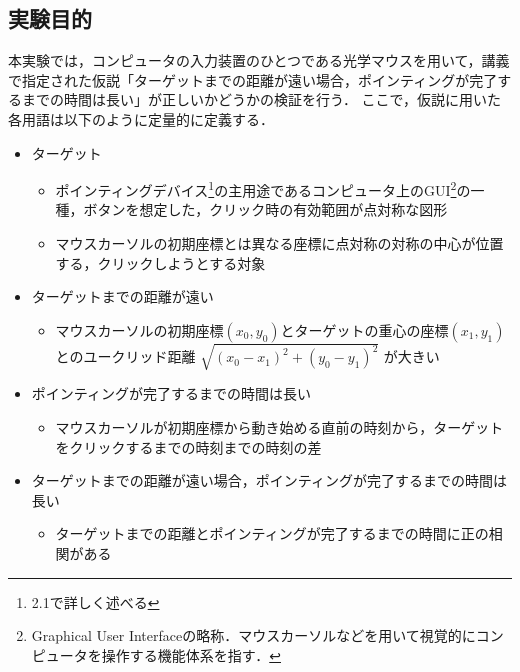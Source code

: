 \documentclass[a4paper, papersize, titlepage]{jsarticle}
\begin{document}
\begin{multicols}{2}
\section{実験目的}
本実験では，コンピュータの入力装置のひとつである光学マウスを用いて，講義で指定された仮説「ターゲットまでの距離が遠い場合，ポインティングが完了するまでの時間は長い」が正しいかどうかの検証を行う．
ここで，仮説に用いた各用語は以下のように定量的に定義する．

\begin{itemize}
\item ターゲット
\begin{itemize}
\item ポインティングデバイス\footnote{2.1で詳しく述べる}の主用途であるコンピュータ上のGUI\footnote{Graphical User Interfaceの略称．マウスカーソルなどを用いて視覚的にコンピュータを操作する機能体系を指す．}の一種，ボタンを想定した，クリック時の有効範囲が点対称な図形
\item マウスカーソルの初期座標とは異なる座標に点対称の対称の中心が位置する，クリックしようとする対象
\end{itemize}

\item ターゲットまでの距離が遠い
\begin{itemize}
\item マウスカーソルの初期座標$(x_0, y_0)$とターゲットの重心の座標$(x_1, y_1)$とのユークリッド距離 $\sqrt{(x_0 - x_1)^2 + (y_0 - y_1)^2}$ が大きい
\end{itemize}

\item ポインティングが完了するまでの時間は長い
\begin{itemize}
\item マウスカーソルが初期座標から動き始める直前の時刻から，ターゲットをクリックするまでの時刻までの時刻の差
\end{itemize}

\item ターゲットまでの距離が遠い場合，ポインティングが完了するまでの時間は長い
\begin{itemize}
\item ターゲットまでの距離とポインティングが完了するまでの時間に正の相関がある
\end{itemize}
\end{itemize}



\end{multicols}
\end{document}
